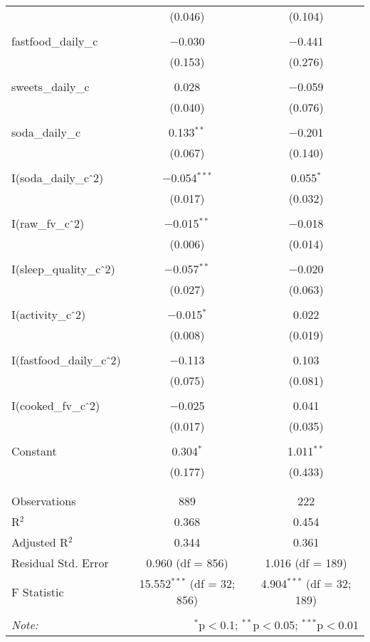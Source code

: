 \documentclass[
]{article}
\begin{document}
\begin{table}[!htbp]
\begin{tabular}{@{\extracolsep{5pt}}lcc}
  & (0.046) & (0.104) \\ 
  & & \\ 
 fastfood\_daily\_c & $-$0.030 & $-$0.441 \\ 
  & (0.153) & (0.276) \\ 
  & & \\ 
 sweets\_daily\_c & 0.028 & $-$0.059 \\ 
  & (0.040) & (0.076) \\ 
  & & \\ 
 soda\_daily\_c & 0.133$^{**}$ & $-$0.201 \\ 
  & (0.067) & (0.140) \\ 
  & & \\ 
 I(soda\_daily\_c$\hat{\mkern6mu}$2) & $-$0.054$^{***}$ & 0.055$^{*}$ \\ 
  & (0.017) & (0.032) \\ 
  & & \\ 
 I(raw\_fv\_c$\hat{\mkern6mu}$2) & $-$0.015$^{**}$ & $-$0.018 \\ 
  & (0.006) & (0.014) \\ 
  & & \\ 
 I(sleep\_quality\_c$\hat{\mkern6mu}$2) & $-$0.057$^{**}$ & $-$0.020 \\ 
  & (0.027) & (0.063) \\ 
  & & \\ 
 I(activity\_c$\hat{\mkern6mu}$2) & $-$0.015$^{*}$ & 0.022 \\ 
  & (0.008) & (0.019) \\ 
  & & \\ 
 I(fastfood\_daily\_c$\hat{\mkern6mu}$2) & $-$0.113 & 0.103 \\ 
  & (0.075) & (0.081) \\ 
  & & \\ 
 I(cooked\_fv\_c$\hat{\mkern6mu}$2) & $-$0.025 & 0.041 \\ 
  & (0.017) & (0.035) \\ 
  & & \\ 
 Constant & 0.304$^{*}$ & 1.011$^{**}$ \\ 
  & (0.177) & (0.433) \\ 
  & & \\ 
\hline \\[-1.8ex] 
Observations & 889 & 222 \\ 
R$^{2}$ & 0.368 & 0.454 \\ 
Adjusted R$^{2}$ & 0.344 & 0.361 \\ 
Residual Std. Error & 0.960 (df = 856) & 1.016 (df = 189) \\ 
F Statistic & 15.552$^{***}$ (df = 32; 856) & 4.904$^{***}$ (df = 32; 189) \\ 
\hline 
\hline \\[-1.8ex] 
\textit{Note:}  & \multicolumn{2}{r}{$^{*}$p$<$0.1; $^{**}$p$<$0.05; $^{***}$p$<$0.01} \\ 
\end{tabular} 
\end{table}
\end{document}
